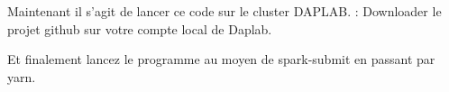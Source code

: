 \documentclass[11pt]{article}
\newcommand{\question}[1] %
{
\refstepcounter{questions} %
\par\noindent %
\phantomsection %
\addcontentsline{faq}{questions}{#1} %
\todo[inline, color=blue!40]{\textbf{#1}} %
\vspace{1em} %
}
\begin{document}
Maintenant il s'agit de lancer ce code sur le cluster DAPLAB. : Downloader le projet github sur votre compte local de Daplab.




Et finalement lancez le programme au moyen de spark-submit en passant par yarn.






% 
% 
% 
% 
% 
% 
% 
% 
% 
% 
% 
% 
% 
% 
% 
% 
% 
% 
% 
% 
\end{document}
